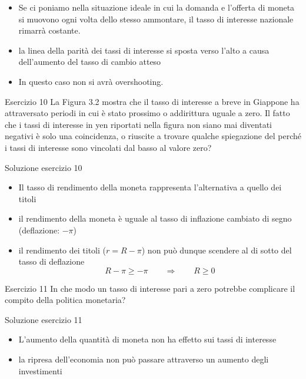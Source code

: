 \begin{frame}{}
\protect\hypertarget{section}{}
\begin{itemize}
\item
  Se ci poniamo nella situazione ideale in cui la domanda e l'offerta di
  moneta si muovono ogni volta dello stesso ammontare, il tasso di
  interesse nazionale rimarrà costante.
\item
  la linea della parità dei tassi di interesse si sposta verso l'alto a
  causa dell'aumento del tasso di cambio atteso
\item
  In questo caso non si avrà overshooting.
\end{itemize}
\end{frame}

\begin{frame}{Esercizio 10}
\protect\hypertarget{esercizio-10}{}
La Figura 3.2 mostra che il tasso di interesse a breve in Giappone ha
attraversato periodi in cui è stato prossimo o addirittura uguale a
zero. Il fatto che i tassi di interesse in yen riportati nella figura
non siano mai diventati negativi è solo una coincidenza, o riuscite a
trovare qualche spiegazione del perché i tassi di interesse sono
vincolati dal basso al valore zero?
\end{frame}

\begin{frame}{Soluzione esercizio 10}
\protect\hypertarget{soluzione-esercizio-10}{}
\begin{itemize}
\item
  Il tasso di rendimento della moneta rappresenta l'alternativa a quello
  dei titoli
\item
  il rendimento della moneta è uguale al tasso di inflazione cambiato di
  segno (deflazione: \(-\pi\))
\item
  il rendimento dei titoli (\(r=R-\pi\)) non può dunque scendere al di
  sotto del tasso di deflazione
  \[R-\pi\ge -\pi \qquad \Rightarrow \qquad R\ge 0\]
\end{itemize}
\end{frame}

\begin{frame}{Esercizio 11}
\protect\hypertarget{esercizio-11}{}
In che modo un tasso di interesse pari a zero potrebbe complicare il
compito della politica monetaria?
\end{frame}

\begin{frame}{Soluzione esercizio 11}
\protect\hypertarget{soluzione-esercizio-11}{}
\begin{itemize}
\item
  L'aumento della quantità di moneta non ha effetto sui tassi di
  interesse
\item
  la ripresa dell'economia non può passare attraverso un aumento degli
  investimenti
\end{itemize}
\end{frame}
